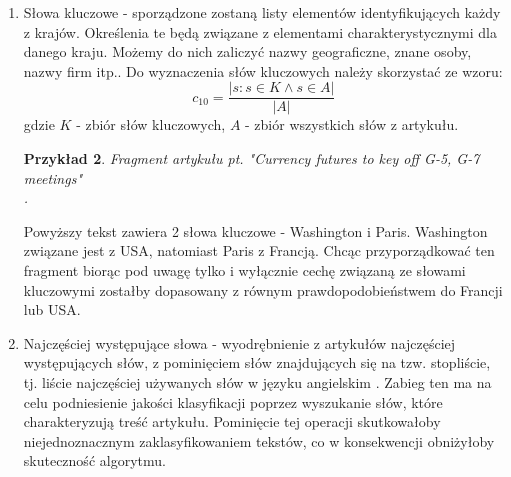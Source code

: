 \documentclass{classrep}
\newtheorem{exmp}{Przykład}[section]
\begin{document}
\begin{enumerate}
    \begin{exmp}Fragment artykułu pt. "Hughes changes stance on merger after suit" \cite{reuters} \\
    . \\
    \end{exmp}
    W podanym fragmencie cytat wystąpił 2 razy. Uważamy, że artykuły dotyczące różnych krajów będą też zawierały różną liczbę cytatów. \\

    \item Słowa kluczowe - sporządzone zostaną listy elementów identyfikujących każdy z krajów. Określenia te będą związane z elementami charakterystycznymi dla danego kraju. Możemy do nich zaliczyć nazwy geograficzne, znane osoby, nazwy firm itp.. Do wyznaczenia słów kluczowych należy skorzystać ze wzoru: 
    \begin{equation}
        c_{10} = \frac{|{s: s \in K \land s \in A}|}{|A|}
    \end{equation}
    gdzie $K$ - zbiór słów kluczowych, $A$ - zbiór wszystkich słów z artykułu. \\
    \begin{exmp}Fragment artykułu pt. "Currency futures to key off G-5, G-7 meetings" \cite{reuters} \\
    . \\
    \end{exmp}
    Powyższy tekst zawiera 2 słowa kluczowe - Washington i Paris. Washington związane jest z USA, natomiast Paris z Francją. Chcąc przyporządkować ten fragment biorąc pod uwagę tylko i wyłącznie cechę związaną ze słowami kluczowymi zostałby dopasowany z równym prawdopodobieństwem do Francji lub USA. \\
    \item Najczęściej występujące słowa - wyodrębnienie z artykułów najczęściej występujących słów, z pominięciem słów znajdujących się na tzw. stopliście, tj. liście najczęściej używanych słów w języku angielskim \cite{coca_words}. Zabieg ten ma na celu podniesienie jakości klasyfikacji poprzez wyszukanie słów, które charakteryzują treść artykułu. Pominięcie tej operacji skutkowałoby niejednoznacznym zaklasyfikowaniem tekstów, co w konsekwencji obniżyłoby skuteczność algorytmu. 

\end{enumerate}
\end{document}
